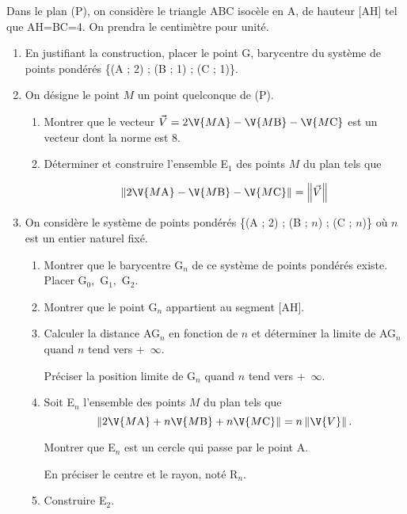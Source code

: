 \documentclass[a4paper]{article}
\begin{document}
\vspace{0,25cm}

Dans le plan (P), on consid\`ere le triangle ABC isoc\`ele en A, de 
hauteur [AH] tel que AH=BC=4. On prendra le centim\`etre pour 
unit\'e. 

\begin{enumerate} \item En justifiant la construction, placer le 
point G, barycentre du syst\`eme de points pond\'er\'es \{(A ; 2) ; (B ; 
1) ; (C ; 1)\}. 

\item On d\'esigne le point $M$ un point quelconque 
de (P). 

\begin{enumerate} \item Montrer que le vecteur $\vec{V} = 2\V{M\text{A}} - 
\V{M\text{B}} - \V{M\text{C}}$ est un 
vecteur dont la norme est 8. 

\item D\'eterminer et construire l'ensemble E$_{1}$ des points $M$ du plan 
tels que 

\[\left\|2\V{M\text{A}} - \V{M\text{B}} - \V{M\text{C}}\right\| = \left\|\vec{V}\right\|\] 

\end{enumerate} 

\item On consid\`ere le syst\`eme de points pond\'er\'es 
\{(A ; 2) ; (B ; $n$) ; (C ; $n$)\} o\`u $n$ est un entier naturel 
fix\'e. 

\begin{enumerate} \item Montrer que le barycentre G$_{n}$ de ce syst\`eme de points 
pond\'er\'es existe. Placer G$_{0}$,~G$_{1}$,~G$_{2}$. 

\item Montrer que le point G$_{n}$ appartient au segment [AH]. 

\item Calculer la distance AG$_{n}$ en fonction de $n$ et d\'eterminer la 
limite de AG$_{n}$ quand $n$ tend vers +~$\infty$. 

Pr\'eciser la position limite de G$_{n}$ quand $n$ tend vers +~$\infty$. 

\item Soit E$_{n}$ l'ensemble des points $M$ du plan tels que 
\[\left\|2\V{M\text{A}} + n \V{M\text{B}} + 
n\V{M\text{C}}\right\| = n\left\|\V{V}\right\|.\] 

Montrer que E$_{n}$ est un cercle qui passe par le point A. 

En pr\'eciser le centre et le rayon, not\'e R$_{n}$. 

\item Construire E$_{2}$. 

\end{enumerate} 

\end{enumerate} 
\end{document}
